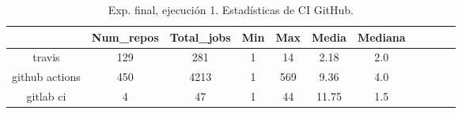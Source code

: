 \begin{table}[h]
  \centering
  \caption{Exp. final, ejecución 1. Estadísticas de CI GitHub.}
  \label{tab:tabla_f_1_2}

\begin{footnotesize}
\renewcommand{\arraystretch}{1.5} %
\begin{tabular}{ccccccccccc}
  \hline
  {} &  Num\_repos &  Total\_jobs &  Min &  Max &  Media &  Mediana \\
  \hline
  travis         &        129 &         281 &    1 &   14 &   2.18 &      2.0 \\
  github actions &        450 &        4213 &    1 &  569 &   9.36 &      4.0 \\
  gitlab ci      &          4 &          47 &    1 &   44 &  11.75 &      1.5 \\
 \end{tabular}
\end{footnotesize}

\end{table}


